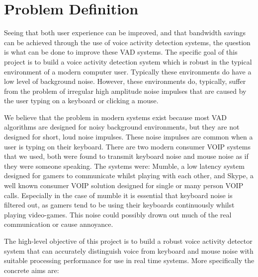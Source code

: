 \documentclass[ %
                    author={Sam Phippen},
                supervisor={Dr. Rafal Bogacz},
                     title={Real time voice activity detectors in noisy personal computing environments},
                  subtitle={},
                    degree={MEng},
                      year={2012} ]{thesis}
\begin{document}
\section{Problem Definition}

Seeing that both user experience can be improved, and that bandwidth savings
can be achieved through the use of voice activity detection systems, the
question is what can be done to improve these VAD systems. The specific goal of
this project is to build a voice activity detection system which is robust in
the typical environment of a modern computer user. Typically these environments
do have a low level of background noise. However, these environments do,
typically, suffer from the problem of irregular high amplitude noise impulses
that are caused by the user typing on a keyboard or clicking a mouse.

We believe that the problem in modern systems exist because most VAD algorithms
are designed for noisy background environments\cite{shin}, but they are not
designed for short, loud noise impulses. These noise impulses are common when a
user is typing on their keyboard. There are two modern consumer VOIP systems
that we used, both were found to transmit keyboard noise and mouse noise  as if
they were someone speaking. The systems were: Mumble\cite{mumble}, a low
latency system designed for gamers to communicate whilst playing with each
other, and Skype\texttrademark\cite{skype}, a well known consumer VOIP solution
designed for single or many person VOIP calls.  Especially in the case of
mumble it is essential that keyboard noise is filtered out, as gamers tend to
be using their keyboards continuously whilst playing video-games. This noise
could possibly drown out much of the real communication or cause annoyance.

The high-level objective of this project is to build a robust voice activity
detector system that can accurately distinguish voice from keyboard and mouse
noise with suitable processing performance for use in real time systems. More
specifically the concrete aims are:
\end{document}
